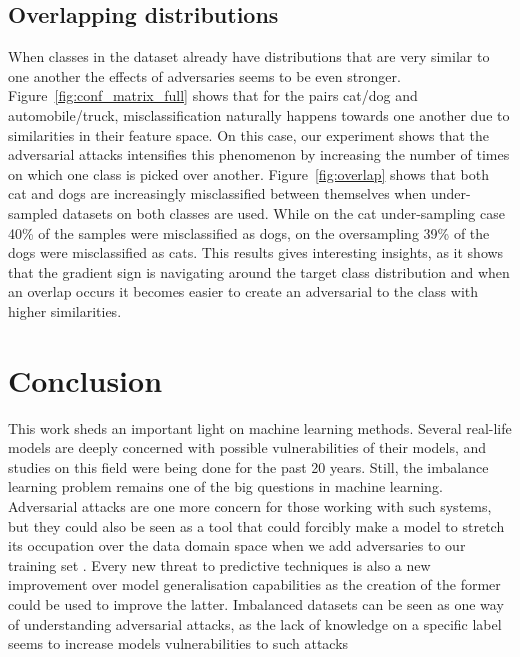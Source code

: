 \documentclass[runningheads,a4paper]{llncs}
\begin{document}
\subsection{Overlapping distributions}

When classes in the dataset already have distributions that are very similar to one another the effects of adversaries seems to be even stronger. Figure~\ref{fig:conf_matrix_full} shows that for the pairs cat/dog and automobile/truck, misclassification naturally happens towards one another due to similarities in their feature space. On this case, our experiment shows that the adversarial attacks intensifies this phenomenon by increasing the number of times on which one class is picked over another. Figure~\ref{fig:overlap} shows that both cat and dogs are increasingly misclassified between themselves when under-sampled datasets on both classes are used. While on the cat under-sampling case 40\% of the samples were misclassified as dogs, on the oversampling 39\% of the dogs were misclassified as cats. This results gives interesting insights, as it shows that the gradient sign is navigating around the target class distribution and when an overlap occurs it becomes easier to create an adversarial to the class with higher similarities.


\section{Conclusion}

This work sheds an important light on machine learning methods. Several real-life models are deeply concerned with possible vulnerabilities of their models, and studies on this field were being done for the past 20 years. Still, the imbalance learning problem remains one of the big questions in machine learning. Adversarial attacks are one more concern for those working with such systems, but they could also be seen as a tool that could forcibly make a model to stretch its occupation over the data domain space when we add adversaries to our training set \cite{goodfellow2016}. Every new threat to predictive techniques is also a new improvement over model generalisation capabilities as the creation of the former could be used to improve the latter. Imbalanced datasets can be seen as one way of understanding adversarial attacks, as the lack of knowledge on a specific label seems to increase models vulnerabilities to such attacks
\end{document}
